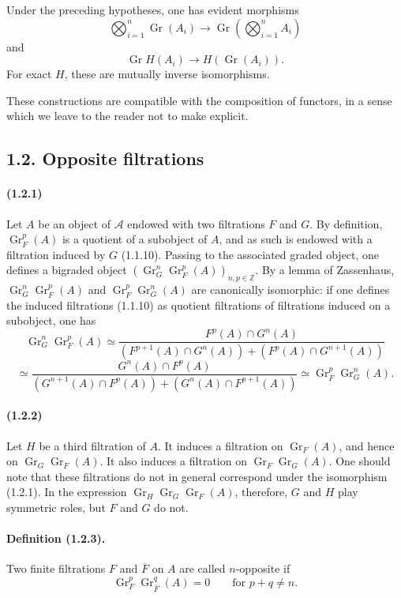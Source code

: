 \documentclass[10pt]{article}
\newcommand{\Z}{\mathbb Z}
\newcommand{\Gr}{\operatorname{Gr}}
\newcommand{\calA}{\mathcal A}
\begin{document}
Under the preceding hypotheses, one has evident morphisms
\[
\bigotimes_{i=1}^n\Gr(A_i)\to \Gr\left(\bigotimes_{i=1}^nA_i\right)
\]
and
\[
\Gr H(A_i)\to H(\Gr(A_i)).
\]
For exact $H$, these are mutually inverse isomorphisms.

These constructions are compatible with the composition of functors, in a sense which we leave to the reader not to make explicit.

\subsection*{1.2. Opposite filtrations}

\paragraph{(1.2.1)} Let $A$ be an object of $\calA$ endowed with two filtrations $F$ and $G$. By definition, $\Gr_F^p(A)$ is a quotient of a subobject of $A$, and as such is endowed with a filtration induced by $G$ (1.1.10). Passing to the associated graded object, one defines a bigraded object $(\Gr_G^n\Gr_F^p(A))_{n,p\in\Z}$. By a lemma of Zassenhaus, $\Gr_G^n\Gr_F^p(A)$ and $\Gr_F^p\Gr_G^n(A)$ are canonically isomorphic: if one defines the induced filtrations (1.1.10) as quotient filtrations of filtrations induced on a subobject, one has
\[
\Gr_G^n\Gr_F^p(A)\simeq
\frac{F^p(A)\cap G^n(A)}{(F^{p+1}(A)\cap G^n(A))+(F^p(A)\cap G^{n+1}(A))}
\]
\[
\simeq
\frac{G^n(A)\cap F^p(A)}{(G^{n+1}(A)\cap F^p(A))+(G^n(A)\cap F^{p+1}(A))}
\simeq \Gr_F^p\Gr_G^n(A).
\]

\paragraph{(1.2.2)} Let $H$ be a third filtration of $A$. It induces a filtration on $\Gr_F(A)$, and hence on $\Gr_G\Gr_F(A)$. It also induces a filtration on $\Gr_F\Gr_G(A)$. One should note that these filtrations do not in general correspond under the isomorphism (1.2.1). In the expression $\Gr_H\Gr_G\Gr_F(A)$, therefore, $G$ and $H$ play symmetric roles, but $F$ and $G$ do not.

\paragraph{Definition (1.2.3).} Two finite filtrations $F$ and $\overline F$ on $A$ are called $n$-opposite if
\[
\Gr_F^p\Gr_{\overline F}^{q}(A)=0\qquad\text{for }p+q\ne n.
\]
\end{document}
